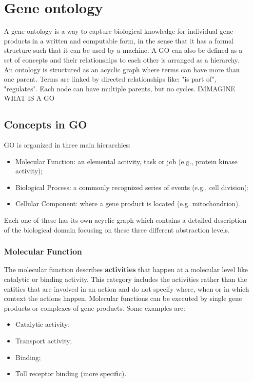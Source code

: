 \section{Gene ontology}
A gene ontology is a way to capture biological knowledge for individual gene products in a written and computable form, in the sense that it has a formal structure such that it can be used by a machine.
A GO can also be defined as a set of concepts and their relationships to each other is arranged as a hierarchy.
An ontology is structured as an acyclic graph where terms can have more than one parent.
	Terms are linked by directed relationships like: "is part of", "regulates".
	Each node can have multiple parents, but no cycles. 
IMMAGINE WHAT IS A GO

\subsection{Concepts in GO}
GO is organized in three main hierarchies:
\begin{itemize}
\item Molecular Function: an elemental activity, task or job (e.g., protein kinase activity);
\item Biological Process: a commonly recognized series of events (e.g., cell division);
\item Cellular Component: where a gene product is located (e.g. mitochondrion).
\end{itemize}

Each one of these has its own acyclic graph which contains a detailed description of the biological domain focusing on these three different abstraction levels. 

		\subsubsection{Molecular Function}
		The molecular function describes \textbf{activities} that happen at a molecular level like catalytic or binding activity.
		This category includes the activities rather than the entities that are involved in an action and do not specify where, when or in which context the actions happen.
		Molecular functions can be executed by single gene products or complexes of gene products.
		Some examples are:

		\begin{multicols}{4}
			\begin{itemize}
				\item Catalytic activity;
				\item Transport activity;
				\item Binding;
				\item Toll receptor binding (more specific).
			\end{itemize}
		\end{multicols}

